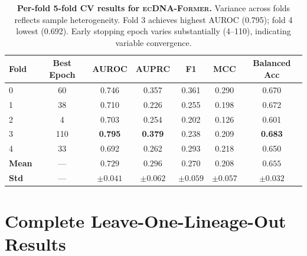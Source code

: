 \documentclass{article}
\newcommand{\former}{\textsc{ecDNA-Former}}
\begin{document}
\begin{table}[H]
\caption{\textbf{Per-fold 5-fold CV results for \former{}.} Variance across folds reflects sample heterogeneity. Fold 3 achieves highest AUROC (0.795); fold 4 lowest (0.692). Early stopping epoch varies substantially (4--110), indicating variable convergence.}
\label{tab:perfold}
\centering
\small
\begin{tabular}{@{}lcccccc@{}}
\toprule
Fold & Best Epoch & AUROC & AUPRC & F1 & MCC & Balanced Acc \\
\midrule
0 & 60 & 0.746 & 0.357 & 0.361 & 0.290 & 0.670 \\
1 & 38 & 0.710 & 0.226 & 0.255 & 0.198 & 0.672 \\
2 & 4 & 0.703 & 0.254 & 0.202 & 0.126 & 0.601 \\
3 & 110 & \textbf{0.795} & \textbf{0.379} & 0.238 & 0.209 & \textbf{0.683} \\
4 & 33 & 0.692 & 0.262 & 0.293 & 0.218 & 0.650 \\
\midrule
\textbf{Mean} & --- & $0.729$ & $0.296$ & $0.270$ & $0.208$ & $0.655$ \\
\textbf{Std} & --- & $\pm 0.041$ & $\pm 0.062$ & $\pm 0.059$ & $\pm 0.057$ & $\pm 0.032$ \\
\bottomrule
\end{tabular}
\end{table}


\section{Complete Leave-One-Lineage-Out Results}
\label{app:loocv}
\end{document}
